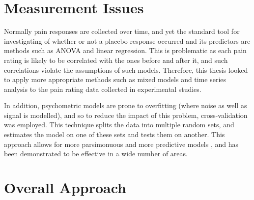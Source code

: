 \documentclass{article}
\begin{document}



\section{Measurement Issues}
\label{sec:measurement-issues}

Normally pain responses are collected over time, and yet the standard tool for investigating of whether or not a placebo response occurred and its predictors are methods such as ANOVA and linear regression. This is problematic as each pain rating is likely to be correlated with the ones before and after it, and such correlations violate the assumptions of such models. Therefore, this thesis looked to apply more appropriate methods such as mixed models and time series analysis to the pain rating data collected in experimental studies. 

In addition,  psychometric models are prone to overfitting (where noise as well as signal is modelled), and so to reduce the impact of this problem, cross-validation was employed. This technique splits the data into multiple random sets, and estimates the model on one of these sets and tests them on another. This approach allows for more parsimonuous and more predictive models \cite{friedman2009elements}, and has been demonstrated to be effective in a wide number of areas. 

\section{Overall Approach}
\label{sec:overall-approach}
\end{document}

